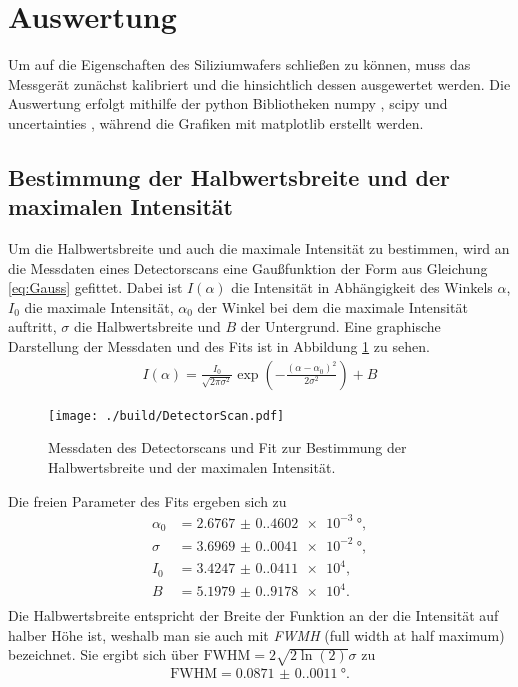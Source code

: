 \section{Auswertung}
\label{sec:Auswertung}

Um auf die Eigenschaften des Siliziumwafers schließen zu können, muss das Messgerät zunächst kalibriert und die hinsichtlich dessen ausgewertet werden.
Die Auswertung erfolgt mithilfe der python Bibliotheken numpy \cite{numpy}, scipy \cite{scipy} und uncertainties \cite{uncertainties}, während die Grafiken mit matplotlib \cite{matplotlib} erstellt werden.

\subsection{Bestimmung der Halbwertsbreite und der maximalen Intensität}
\label{subsec:Halbwertsbreite}

Um die Halbwertsbreite und auch die maximale Intensität zu bestimmen, wird an die Messdaten eines Detectorscans eine Gaußfunktion der Form aus Gleichung \ref{eq:Gauss} gefittet. 
Dabei ist $I(\alpha)$ die Intensität in Abhängigkeit des Winkels $\alpha$, $I_0$ die maximale Intensität, $\alpha_0$ der Winkel bei dem die maximale Intensität auftritt, $\sigma$ die Halbwertsbreite und $B$ der Untergrund.
Eine graphische Darstellung der Messdaten und des Fits ist in Abbildung \ref{fig:Gauss} zu sehen.
\begin{align}
    I(\alpha) = \frac{I_0}{\sqrt{2\pi\sigma^2}} \exp\left(-\frac{(\alpha-\alpha_0)^2}{2\sigma^2}\right) +B
    \label{eq:Gauss}
\end{align}
\begin{figure}[H]
    \centering
    \texttt{[image: ./build/DetectorScan.pdf]}
    \caption{Messdaten des Detectorscans und Fit zur Bestimmung der Halbwertsbreite und der maximalen Intensität.}
    \label{fig:Gauss}
\end{figure}
\noindent
Die freien Parameter des Fits ergeben sich zu
\begin{align*}
    \alpha_0 &= \SI{2.6767(0.4602)e-3}{\degree}, \\
    \sigma &= \SI{3.6969(0.0041)e-2}{\degree}, \\
    I_0 &= \SI{3.4247(0.0411)e4},\\
    B &= \SI{5.1979(0.9178)e4}.\\
\end{align*}
Die Halbwertsbreite entspricht der Breite der Funktion an der die Intensität auf halber Höhe ist, weshalb man sie auch mit \textit{FWMH} (full width at half maximum) bezeichnet.
Sie ergibt sich über $\text{FWHM} = 2\sqrt{2\ln(2)}\sigma$ zu
\begin{align*}
    \text{FWHM} = \SI{0.0871(0.0011)}{\degree}.
\end{align*}


